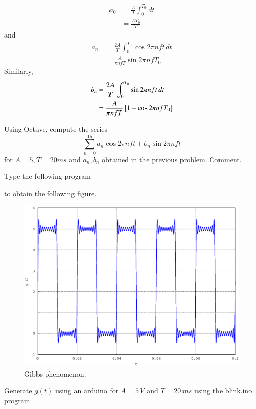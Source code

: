 %
\solution 
\begin{align}
a_0 &= \frac{A}{T} \int_{0}^{T_0}  dt \\
&= \frac{AT_0}{T}
\end{align}
and
\begin{align}
a_n &= \frac{2A}{T} \int_{0}^{T_0}\cos 2\pi nf t \,  dt \\
&= \frac{A}{\pi n f T }\sin 2\pi n f T_0
\end{align}
Similarly, 
\begin{align}
b_n &= \frac{2A}{T} \int_{0}^{T_0}\sin 2\pi nf t \,  dt \\
&= \frac{A}{\pi n f T }{}\left[1 - \cos 2\pi n f T_0\right]
\end{align}

%
\begin{problem}
Using Octave, compute the series 
%
\begin{equation}
\sum_{n=0}^{15}a_n\cos 2\pi n f t + b_n \sin 2 \pi n f t
\end{equation}
%
for $A=5, T= 20 ms$ and $a_n,b_n$ obtained in the previous problem.  Comment.
%
\label{fourier_series}
\end{problem}
\solution  Type the following program
%

to obtain the following figure.
\begin{figure}[!h]
\centering

\includegraphics[width=\columnwidth]{./chapter1/figs/1.4.eps}
\caption{Gibbs phenomenon.}
\label{fig:1.4}
\end{figure}
%
\begin{problem}
  Generate $g(t)$ using an arduino for $A = 5\, V$ and $T = 20 \, ms$ using the blink.ino program.
  \end{problem}
%



